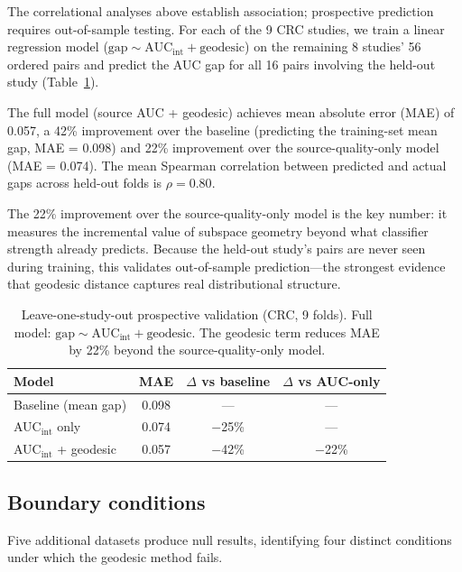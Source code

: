 \documentclass{article}
\begin{document}
The correlational analyses above establish association; prospective prediction requires out-of-sample testing. For each of the 9 CRC studies, we train a linear regression model ($\text{gap} \sim \text{AUC}_{\mathrm{int}} + \text{geodesic}$) on the remaining 8 studies' 56 ordered pairs and predict the AUC gap for all 16 pairs involving the held-out study (Table~\ref{tab:loo}).

The full model (source AUC + geodesic) achieves mean absolute error (MAE) of 0.057, a 42\% improvement over the baseline (predicting the training-set mean gap, MAE = 0.098) and 22\% improvement over the source-quality-only model (MAE = 0.074). The mean Spearman correlation between predicted and actual gaps across held-out folds is $\rho = 0.80$.

The 22\% improvement over the source-quality-only model is the key number: it measures the incremental value of subspace geometry beyond what classifier strength already predicts. Because the held-out study's pairs are never seen during training, this validates out-of-sample prediction---the strongest evidence that geodesic distance captures real distributional structure.

\begin{table}[t]
\centering
\caption{Leave-one-study-out prospective validation (CRC, 9 folds). Full model: $\text{gap} \sim \text{AUC}_{\mathrm{int}} + \text{geodesic}$. The geodesic term reduces MAE by 22\% beyond the source-quality-only model.}
\label{tab:loo}
\begin{tabular}{lccc}
\toprule
Model & MAE & $\Delta$ vs baseline & $\Delta$ vs AUC-only \\
\midrule
Baseline (mean gap) & 0.098 & --- & --- \\
AUC$_{\mathrm{int}}$ only & 0.074 & $-$25\% & --- \\
AUC$_{\mathrm{int}}$ + geodesic & 0.057 & $-$42\% & $-$22\% \\
\bottomrule
\end{tabular}
\end{table}


\subsection{Boundary conditions}
\label{sec:boundary}

Five additional datasets produce null results, identifying four distinct conditions under which the geodesic method fails.
\end{document}
